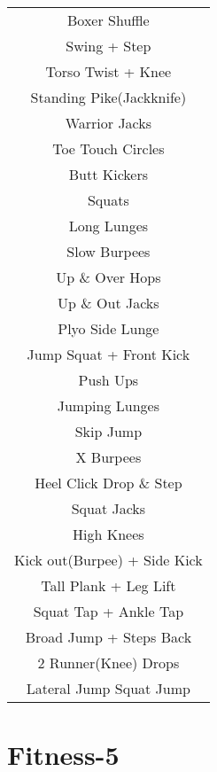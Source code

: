 \documentclass[12pt]{article}
\newcommand\myPadding{1.5}
\begin{document}
\begin{center}
  \bgroup
  \def\arraystretch{\myPadding}%
  \begin{tabular}{ c  }
Boxer Shuffle 
\\
Swing + Step
\\
Torso Twist + Knee
\\
Standing Pike(Jackknife)
\\
Warrior Jacks
\\
Toe Touch Circles
\\
Butt Kickers
\\
Squats
\\
Long Lunges
\\
Slow Burpees
\\
Up \& Over Hops
\\
Up \& Out Jacks
\\
Plyo Side Lunge
\\
Jump Squat + Front Kick
\\
Push Ups
\\
Jumping Lunges
\\
Skip Jump
\\
X Burpees
\\
Heel Click Drop \& Step
\\
Squat Jacks
\\
High Knees
\\
Kick out(Burpee) + Side Kick
\\
Tall Plank + Leg Lift
\\
Squat Tap + Ankle Tap
\\
Broad Jump + Steps Back
\\
2 Runner(Knee) Drops 
\\
Lateral Jump Squat Jump
  \end{tabular}
  \egroup
\end{center}





\section{Fitness-5}
\end{document}
